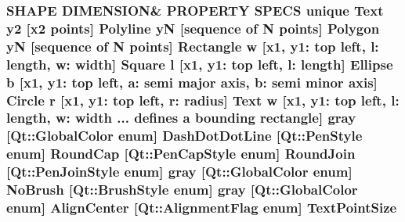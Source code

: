 \subsubsection[{\texorpdfstring{Text\+Point\+Size}{TextPointSize}}]{\setlength{\rightskip}{0pt plus 5cm}S\+H\+A\+PE D\+I\+M\+E\+N\+S\+I\+ON\& P\+R\+O\+P\+E\+R\+TY S\+P\+E\+CS unique {\bf Text} {\bf y2} \mbox{[}{\bf x2} points\mbox{]} {\bf Polyline} yN \mbox{[}sequence of N points\mbox{]} {\bf Polygon} yN \mbox{[}sequence of N points\mbox{]} {\bf Rectangle} w \mbox{[}{\bf x1}, y1\+: top left, l\+: length, w\+: width\mbox{]} {\bf Square} {\bf l} \mbox{[}{\bf x1}, y1\+: top left, l\+: length\mbox{]} {\bf Ellipse} b \mbox{[}{\bf x1}, y1\+: top left, a\+: semi major axis, b\+: semi minor axis\mbox{]} {\bf Circle} r \mbox{[}{\bf x1}, y1\+: top left, r\+: radius\mbox{]} {\bf Text} w \mbox{[}{\bf x1}, y1\+: top left, l\+: length, w\+: width ... defines {\bf a} bounding rectangle\mbox{]} gray \mbox{[}Qt\+::\+Global\+Color enum\mbox{]} Dash\+Dot\+Dot\+Line \mbox{[}Qt\+::\+Pen\+Style enum\mbox{]} Round\+Cap \mbox{[}{\bf Qt\+::\+Pen\+Cap\+Style} enum\mbox{]} Round\+Join \mbox{[}{\bf Qt\+::\+Pen\+Join\+Style} enum\mbox{]} gray \mbox{[}Qt\+::\+Global\+Color enum\mbox{]} No\+Brush \mbox{[}{\bf Qt\+::\+Brush\+Style} enum\mbox{]} gray \mbox{[}Qt\+::\+Global\+Color enum\mbox{]} Align\+Center \mbox{[}Qt\+::\+Alignment\+Flag enum\mbox{]} Text\+Point\+Size}\hypertarget{shape__input__file__specs_8txt_ae0e0a84c60f03a686d6e986e9d69145b}{}\label{shape__input__file__specs_8txt_ae0e0a84c60f03a686d6e986e9d69145b}
